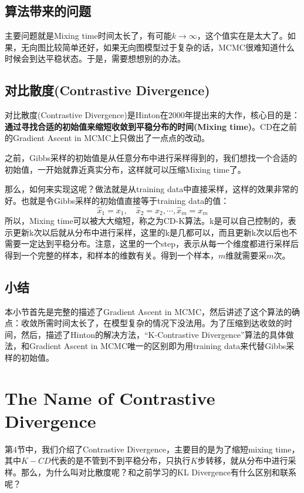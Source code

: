 \documentclass[a4paper]{article}
\begin{document}
\subsection{算法带来的问题}
主要问题就是Mixing time时间太长了，有可能$k \longrightarrow \infty$，这个值实在是太大了。如果，无向图比较简单还好，如果无向图模型过于复杂的话，MCMC很难知道什么时候会到达平稳状态。于是，需要想想别的办法。

\subsection{对比散度(Contrastive Divergence)}
对比散度(Contrastive Divergence)是Hinton在2000年提出来的大作，核心目的是：\textbf{{\color{red}通过寻找合适的初始值来缩短收敛到平稳分布的时间(Mixing time)}}。CD在之前的Gradient Ascent in MCMC上只做出了一点点的改动。

之前，Gibbs采样的初始值是从任意分布中进行采样得到的，我们想找一个合适的初始值，一开始就靠近真实分布，这样就可以压缩Mixing time了。

那么，如何来实现这呢？做法就是从training data中直接采样，这样的效果非常的好。也就是令Gibbs采样的初始值直接等于training data的值：
$$
\hat{x}_1=x_1,\quad \hat{x}_2=x_2,\cdots, \hat{x}_m=x_m
$$
所以，Mixing time可以被大大缩短，称之为CD-K算法。k是可以自己控制的，表示更新k次以后就从分布中进行采样，这里的k是几都可以，而且更新k次以后也不需要一定达到平稳分布。注意，这里的一个step，表示从每一个维度都进行采样后得到一个完整的样本，和样本的维数有关。得到一个样本，$m$维就需要采$m$次。

\subsection{小结}
本小节首先是完整的描述了Gradient Ascent in MCMC，然后讲述了这个算法的确点：收敛所需时间太长了，在模型复杂的情况下没法用。为了压缩到达收敛的时间，然后，描述了Hinton的解决方法，“K-Contrastive Divergence”算法的具体做法，和Gradient Ascent in MCMC唯一的区别即为用training data来代替Gibbs采样的初始值。

\section{The Name of Contrastive Divergence}
第4节中，我们介绍了Contrastive Divergence，主要目的是为了缩短mixing time，其中$K-CD$代表的是不管到不到平稳分布，只执行$K$步转移，就从分布中进行采样。那么，为什么叫对比散度呢？和之前学习的KL Divergence有什么区别和联系呢？
\end{document}
